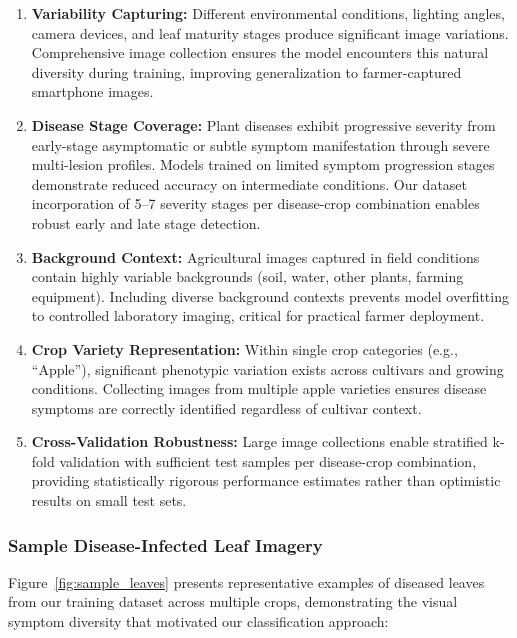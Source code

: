\documentclass[conference]{IEEEtran}
\begin{document}
\begin{enumerate}
\item \textbf{Variability Capturing:} Different environmental conditions, lighting angles, camera devices, and leaf maturity stages produce significant image variations. Comprehensive image collection ensures the model encounters this natural diversity during training, improving generalization to farmer-captured smartphone images.

\item \textbf{Disease Stage Coverage:} Plant diseases exhibit progressive severity from early-stage asymptomatic or subtle symptom manifestation through severe multi-lesion profiles. Models trained on limited symptom progression stages demonstrate reduced accuracy on intermediate conditions. Our dataset incorporation of 5--7 severity stages per disease-crop combination enables robust early and late stage detection.

\item \textbf{Background Context:} Agricultural images captured in field conditions contain highly variable backgrounds (soil, water, other plants, farming equipment). Including diverse background contexts prevents model overfitting to controlled laboratory imaging, critical for practical farmer deployment.

\item \textbf{Crop Variety Representation:} Within single crop categories (e.g., ``Apple''), significant phenotypic variation exists across cultivars and growing conditions. Collecting images from multiple apple varieties ensures disease symptoms are correctly identified regardless of cultivar context.

\item \textbf{Cross-Validation Robustness:} Large image collections enable stratified k-fold validation with sufficient test samples per disease-crop combination, providing statistically rigorous performance estimates rather than optimistic results on small test sets.
\end{enumerate}

\subsubsection{Sample Disease-Infected Leaf Imagery}

Figure~\ref{fig:sample_leaves} presents representative examples of diseased leaves from our training dataset across multiple crops, demonstrating the visual symptom diversity that motivated our classification approach:
\end{document}
